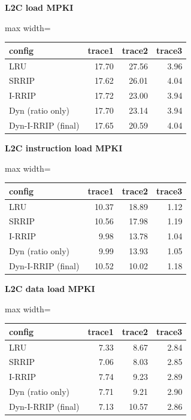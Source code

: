 \documentclass[10pt]{article}
\begin{document}
\begin{center}
\begin{minipage}[t]{0.48\linewidth}\centering
\textbf{L2C load MPKI}\\[3pt]
\begin{adjustbox}{max width=\linewidth}
\begin{tabular}{@{}lrrr@{}}
\toprule
\textbf{config} & \textbf{trace1} & \textbf{trace2} & \textbf{trace3} \\
\midrule
LRU & 17.70 & 27.56 & 3.96 \\
SRRIP & 17.62 & 26.01 & 4.04 \\
I-RRIP & 17.72 & 23.00 & 3.94 \\
Dyn (ratio only) & 17.70 & 23.14 & 3.94 \\
Dyn-I-RRIP (final) & 17.65 & 20.59 & 4.04 \\
\bottomrule
\end{tabular}
\end{adjustbox}
\end{minipage}\hfill
\begin{minipage}[t]{0.48\linewidth}\centering
\textbf{L2C instruction load MPKI}\\[3pt]
\begin{adjustbox}{max width=\linewidth}
\begin{tabular}{@{}lrrr@{}}
\toprule
\textbf{config} & \textbf{trace1} & \textbf{trace2} & \textbf{trace3} \\
\midrule
LRU & 10.37 & 18.89 & 1.12 \\
SRRIP & 10.56 & 17.98 & 1.19 \\
I-RRIP & 9.98 & 13.78 & 1.04 \\
Dyn (ratio only) & 9.99 & 13.93 & 1.05 \\
Dyn-I-RRIP (final) & 10.52 & 10.02 & 1.18 \\
\bottomrule
\end{tabular}
\end{adjustbox}
\end{minipage}
\end{center}
\medskip
\begin{center}
\begin{minipage}[t]{0.48\linewidth}\centering
\textbf{L2C data load MPKI}\\[3pt]
\begin{adjustbox}{max width=\linewidth}
\begin{tabular}{@{}lrrr@{}}
\toprule
\textbf{config} & \textbf{trace1} & \textbf{trace2} & \textbf{trace3} \\
\midrule
LRU & 7.33 & 8.67 & 2.84 \\
SRRIP & 7.06 & 8.03 & 2.85 \\
I-RRIP & 7.74 & 9.23 & 2.89 \\
Dyn (ratio only) & 7.71 & 9.21 & 2.90 \\
Dyn-I-RRIP (final) & 7.13 & 10.57 & 2.86 \\
\bottomrule
\end{tabular}
\end{adjustbox}
\end{minipage}
\end{center}
\end{document}
